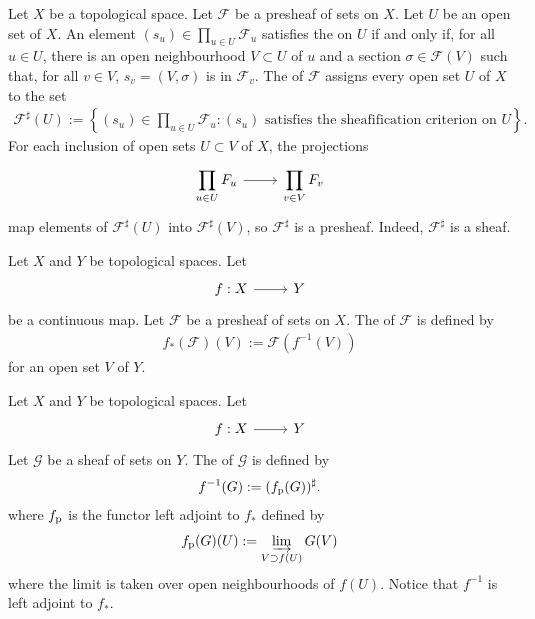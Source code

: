 \documentclass [11 pt, oneside] {article}
\begin{document}
\begin{definition}[ ]\label{}\text{}
Let $X$ be a topological space.
Let $\mathscr{F}$ be a presheaf of sets on $X$. 
Let $U$ be an open set of $X$. An element $(s_{u}) \in \prod_{u\in U} \mathscr{F}_{u}$ satisfies the  on $U$ if and only if, for all $u\in U$, there is an open neighbourhood $V\subset U$ of $u$ and a section $\sigma\in \mathscr{F}(V)$ such that, for all $v\in V$, $s_{v} = (V,\sigma)$ is in $\mathscr{F}_{v}$.
The  of $\mathscr{F}$ assigns every open set $U$ of $X$ to the set
\begin{align*}
	\mathscr{F}^{\sharp}(U) :=  \left\{ \displaystyle (s_{u}) \in \prod_{u\in U}\mathscr{F}_{u} : \textrm{$(s_{u})$ satisfies the sheafification criterion on $U$} \right\}. 
\end{align*}
For each inclusion of open sets $U\subset V$ of $X$, the projections
\[
\begin{tikzcd}
	\displaystyle \prod_{u\in U} \mathscr{F}_{u}\ar[r]& \displaystyle \prod_{v\in V} \mathscr{F}_{v}
\end{tikzcd}
\]
map elements of $\mathscr{F}^{\sharp}(U)$ into $\mathscr{F}^{\sharp}(V)$, so $\mathscr{F}^{\sharp}$ is a presheaf. 
Indeed, $\mathscr{F}^{\sharp}$ is a sheaf.
\end{definition}

\begin{definition}[ ]\label{}\text{}
Let $X$ and $Y$ be topological spaces.
Let 
\[
\begin{tikzcd}
	f:X\ar[r]& Y
\end{tikzcd}
\]
be a continuous map. 
Let $\mathscr{F}$ be a presheaf of sets on $X$. The  of $\mathscr{F}$ is defined by
\begin{align*}
	f_{*}(\mathscr{F}) (V) :=  \mathscr{F}(f^{-1}(V))
\end{align*}
for an open set $V$ of $Y$.
\end{definition}

\begin{definition}[ ]\label{}\text{}
Let $X$ and $Y$ be topological spaces. 
Let
\[
\begin{tikzcd}
	f:X\ar[r]& Y
\end{tikzcd}
\]
Let $\mathscr{G}$ be a sheaf of sets on $Y$. The  of $\mathscr{G}$ is defined by
\begin{align*}
	f^{-1}(\relax{G}) := (f_{\textup {p}}(\relax{G})) ^{\sharp}.
\end{align*}
where $f_{\textup {p}}$ is the functor left adjoint to $f_{*}$ defined by
\begin{align*}
	f_{\textup {p}}(\relax{G}) (U) := \varinjlim _{V\supset f(U)} \relax{G}(V)
\end{align*}
where the limit is taken over open neighbourhoods of $f(U)$. Notice that $f^{-1}$ is left adjoint to $f_{*}$. 
\end{definition}
\end{document}
